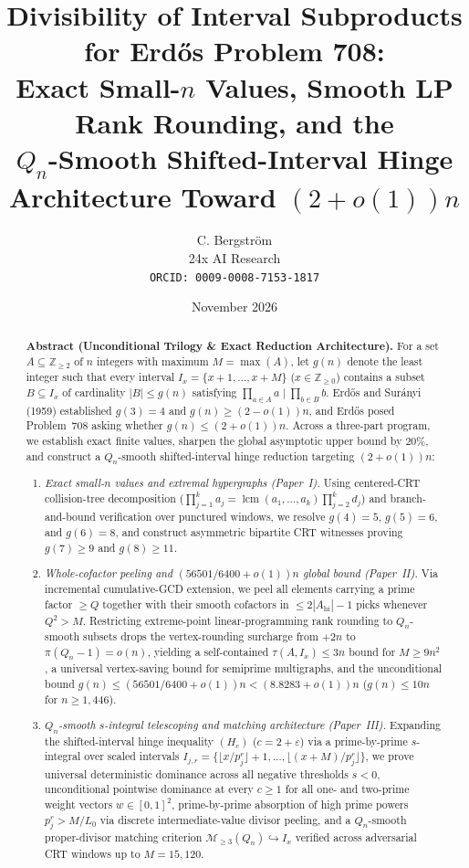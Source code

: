 \documentclass[11pt]{article}
\title{Divisibility of Interval Subproducts for Erd\H{o}s Problem 708:\\
Exact Small-$n$ Values, Smooth LP Rank Rounding, and the\\
$Q_n$-Smooth Shifted-Interval Hinge Architecture Toward $(2 + o(1))n$}
\author{C. Bergstr\"om \\ 24x AI Research \\ \texttt{ORCID: 0009-0008-7153-1817}}
\date{November 2026}
\theoremstyle{remark}
\DeclareMathOperator{\lcm}{lcm}
\begin{document}
\maketitle

\begin{abstract}
\noindent\textbf{Abstract (Unconditional Trilogy \& Exact Reduction Architecture).}
For a set $A \subseteq \mathbb{Z}_{\ge 2}$ of $n$ integers with maximum $M = \max(A)$, let $g(n)$ denote the least integer such that every interval $I_x = \{x + 1, \dots, x + M\}$ ($x \in \mathbb{Z}_{\ge 0}$) contains a subset $B \subseteq I_x$ of cardinality $|B| \le g(n)$ satisfying $\prod_{a \in A} a \mid \prod_{b \in B} b$. Erd\H{o}s and Sur\'anyi (1959) established $g(3) = 4$ and $g(n) \ge (2 - o(1))n$, and Erd\H{o}s posed Problem~708 asking whether $g(n) \le (2 + o(1))n$. Across a three-part program, we establish exact finite values, sharpen the global asymptotic upper bound by $20\%$, and construct a $Q_n$-smooth shifted-interval hinge reduction targeting $(2 + o(1))n$:
\begin{enumerate}
\item \emph{Exact small-$n$ values and extremal hypergraphs (Paper~I).} Using centered-CRT collision-tree decomposition ($\prod_{j=1}^k a_j = \lcm(a_1, \dots, a_k) \prod_{j=2}^k d_j$) and branch-and-bound verification over punctured windows, we resolve $g(4) = 5$, $g(5) = 6$, and $g(6) = 8$, and construct asymmetric bipartite CRT witnesses proving $g(7) \ge 9$ and $g(8) \ge 11$.
\item \emph{Whole-cofactor peeling and $(56501/6400 + o(1))n$ global bound (Paper~II).} Via incremental cumulative-GCD extension, we peel all elements carrying a prime factor $\ge Q$ together with their smooth cofactors in $\le 2|A_{\mathrm{hi}}| - 1$ picks whenever $Q^2 > M$. Restricting extreme-point linear-programming rank rounding to $Q_n$-smooth subsets drops the vertex-rounding surcharge from $+2n$ to $\pi(Q_n - 1) = o(n)$, yielding a self-contained $\tau(A, I_x) \le 3n$ bound for $M \ge 9n^2$, a universal vertex-saving bound for semiprime multigraphs, and the unconditional bound $g(n) \le (56501 / 6400 + o(1))n < (8.8283 + o(1))n$ ($g(n) \le 10n$ for $n \ge 1{,}446$).
\item \emph{$Q_n$-smooth $s$-integral telescoping and matching architecture (Paper~III).} Expanding the shifted-interval hinge inequality $(H_c)$ ($c = 2 + \varepsilon$) via a prime-by-prime $s$-integral over scaled intervals $I_{j,r} = \{\lfloor x / p_j^r \rfloor + 1, \dots, \lfloor (x + M) / p_j^r \rfloor\}$, we prove universal deterministic dominance across all negative thresholds $s < 0$, unconditional pointwise dominance at every $c \ge 1$ for all one- and two-prime weight vectors $w \in [0, 1]^2$, prime-by-prime absorption of high prime powers $p_j^r > M / L_0$ via discrete intermediate-value divisor peeling, and a $Q_n$-smooth proper-divisor matching criterion $\mathcal{M}_{\ge 3}(Q_n) \hookrightarrow I_x$ verified across adversarial CRT windows up to $M = 15{,}120$.

\end{enumerate}
\end{abstract}
\end{document}
